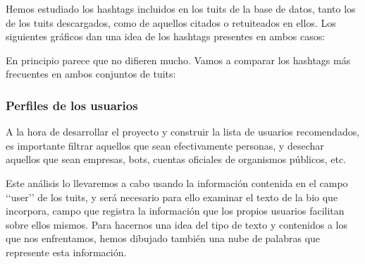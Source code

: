 Hemos estudiado los hashtags incluidos en los tuits de la base de datos, tanto los de los tuits
descargados, como de aquellos citados o retuiteados en ellos. Los siguientes gráficos dan una idea de los hashtags presentes en ambos casos:


En principio parece que no difieren mucho. Vamos a comparar los hashtags más frecuentes
en ambos conjuntos de tuits:


\subsubsection{Perfiles de los usuarios}
A la hora de desarrollar el proyecto y construir la lista de usuarios recomendados, es importante
filtrar aquellos que sean efectivamente personas, y desechar aquellos que sean empresas, bots, cuentas
oficiales de organismos públicos, etc.

Este análisis lo llevaremos a cabo usando la información contenida en el campo \lq\lq user\rq\rq
de los tuits, y será necesario para ello examinar el texto de la bio que incorpora, campo que
registra la información que los propios usuarios facilitan sobre ellos mismos. 
Para hacernos una idea del tipo de texto y contenidos a los que nos enfrentamos, hemos dibujado también
una nube de palabras que represente esta información.


